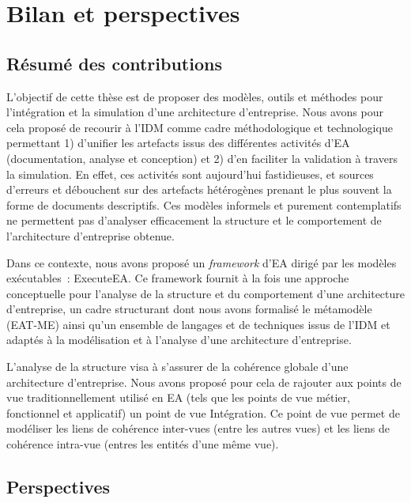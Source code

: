\chapter{Bilan et perspectives}
\label{ch:bilan}

\section{Résumé des contributions}

L'objectif de cette thèse est de proposer des modèles, outils et méthodes pour l'intégration
et la simulation d'une architecture d'entreprise. Nous avons pour cela proposé de recourir
à l'IDM comme cadre méthodologique et technologique permettant 1) d'unifier les artefacts
issus des différentes activités d'EA (documentation, analyse et conception)
et 2) d'en faciliter la validation à travers la simulation.
En effet, ces activités sont aujourd'hui fastidieuses, et sources d'erreurs
et débouchent sur des artefacts hétérogènes prenant le plus souvent la forme
de documents descriptifs. Ces modèles informels et purement contemplatifs
ne permettent pas d'analyser efficacement 
la structure et le comportement de l'architecture d'entreprise obtenue.

Dans ce contexte, nous avons proposé un \emph{framework}
d'EA dirigé par les modèles exécutables~: ExecuteEA. Ce framework fournit à la fois une approche
conceptuelle pour l'analyse de la structure et du comportement d'une architecture d'entreprise, un cadre structurant dont nous
avons formalisé le métamodèle (EAT-ME) ainsi qu'un ensemble de langages et de techniques issus de l'IDM et adaptés à la modélisation
et à l'analyse d'une architecture d'entreprise. 

L'analyse de la structure visa à s'assurer de la cohérence globale d'une architecture d'entreprise. Nous avons
proposé pour cela de rajouter aux points de vue traditionnellement utilisé en EA (tels que les points de vue métier, fonctionnel et
applicatif) un point de vue Intégration. Ce point de vue permet de modéliser les liens de cohérence inter-vues (entre les autres vues)
et les liens de cohérence intra-vue (entres les entités d'une même vue). 





\section{Perspectives}

